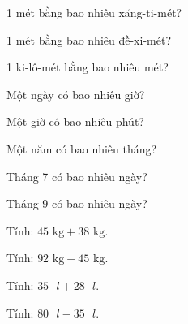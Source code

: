 \begin{ex}
1 mét bằng bao nhiêu xăng-ti-mét?
\end{ex}

\begin{ex}
1 mét bằng bao nhiêu đề-xi-mét?
\end{ex}

\begin{ex}
1 ki-lô-mét bằng bao nhiêu mét?
\end{ex}

\begin{ex}
Một ngày có bao nhiêu giờ?
\end{ex}

\begin{ex}
Một giờ có bao nhiêu phút?
\end{ex}

\begin{ex}
Một năm có bao nhiêu tháng?
\end{ex}

\begin{ex}
Tháng 7 có bao nhiêu ngày?
\end{ex}

\begin{ex}
Tháng 9 có bao nhiêu ngày?
\end{ex}

\begin{ex}
Tính: $45\text{ kg} + 38\text{ kg}$.
\end{ex}

\begin{ex}
Tính: $92\text{ kg} - 45\text{ kg}$.
\end{ex}

\begin{ex}
Tính: $35\text{ }l + 28\text{ }l$.
\end{ex}

\begin{ex}
Tính: $80\text{ }l - 35\text{ }l$.
\end{ex}

